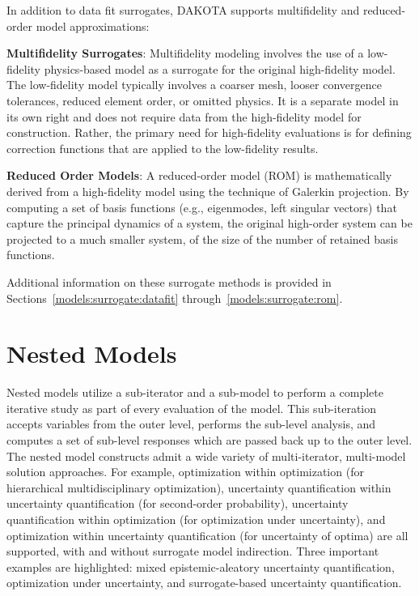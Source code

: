 In addition to data fit surrogates, DAKOTA supports multifidelity 
and reduced-order model approximations:

\textbf{Multifidelity Surrogates}: Multifidelity modeling involves the
use of a low-fidelity physics-based model as a surrogate for the
original high-fidelity model.  The low-fidelity model typically
involves a coarser mesh, looser convergence tolerances, reduced
element order, or omitted physics.  It is a separate model in its own
right and does not require data from the high-fidelity model for
construction.  Rather, the primary need for high-fidelity evaluations
is for defining correction functions that are applied to the
low-fidelity results.

\textbf{Reduced Order Models}: A reduced-order model (ROM) is
mathematically derived from a high-fidelity model using the technique
of Galerkin projection.  By computing a set of basis functions (e.g.,
eigenmodes, left singular vectors) that capture the principal dynamics
of a system, the original high-order system can be projected to a much
smaller system, of the size of the number of retained basis functions.

Additional information on these surrogate methods is provided in
Sections~\ref{models:surrogate:datafit} through~\ref{models:surrogate:rom}.

\section{Nested Models}\label{capabilities:nested}
Nested models utilize a sub-iterator and a sub-model to perform a
complete iterative study as part of every evaluation of the model.
This sub-iteration accepts variables from the outer level, performs
the sub-level analysis, and computes a set of sub-level responses
which are passed back up to the outer level.  The nested model
constructs admit a wide variety of multi-iterator, multi-model
solution approaches.  For example, optimization within optimization
(for hierarchical multidisciplinary optimization), uncertainty
quantification within uncertainty quantification (for second-order
probability), uncertainty quantification within optimization (for
optimization under uncertainty), and optimization within uncertainty
quantification (for uncertainty of optima) are all supported, with and
without surrogate model indirection.  Three important examples are
highlighted: mixed epistemic-aleatory uncertainty quantification, 
optimization under uncertainty, and surrogate-based uncertainty quantification.

